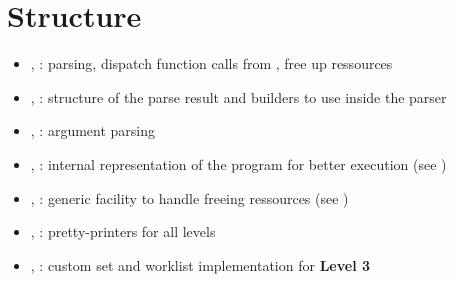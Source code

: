 \section{Structure}

\begin{itemize}
    \item {}, :
        parsing, dispatch function calls from , free up ressources
    \item {}, :
        structure of the parse result and builders to use inside the parser
    \item {}, :
        argument parsing
    \item {}, :
        internal representation of the program for better execution (see )
    \item {}, :
        generic facility to handle freeing ressources (see )
    \item {}, :
        pretty-printers for all levels
    \item {}, :
        custom set and worklist implementation for \textbf{Level 3}
\end{itemize}
